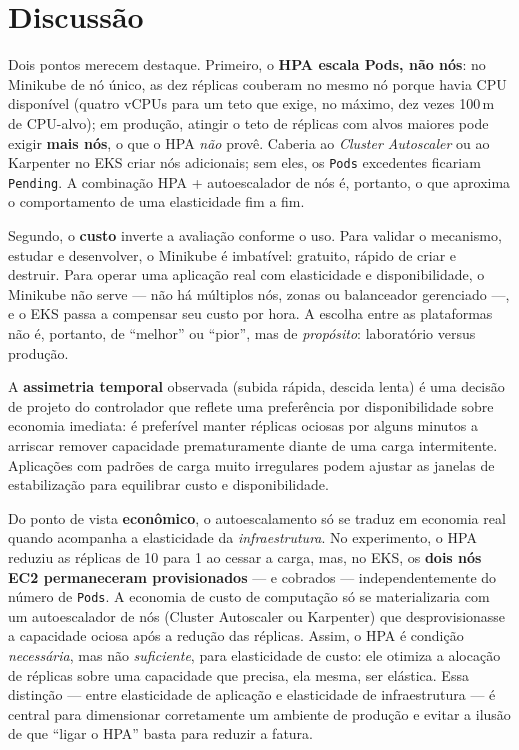 \documentclass[conference]{IEEEtran}
\begin{document}
\section{Discussão}\label{sec:disc}
Dois pontos merecem destaque. Primeiro, o \textbf{HPA escala Pods, não nós}: no Minikube de nó
único, as dez réplicas couberam no mesmo nó porque havia CPU disponível (quatro vCPUs para um teto
que exige, no máximo, dez vezes 100\,m de CPU-alvo); em produção, atingir o teto de réplicas com
alvos maiores pode exigir \textbf{mais nós}, o que o HPA \emph{não} provê. Caberia ao
\textit{Cluster Autoscaler} ou ao Karpenter no EKS criar nós adicionais; sem eles, os
\texttt{Pods} excedentes ficariam \texttt{Pending}. A combinação HPA + autoescalador de nós é,
portanto, o que aproxima o comportamento de uma elasticidade fim a fim.

Segundo, o \textbf{custo} inverte a avaliação conforme o uso. Para validar o mecanismo, estudar e
desenvolver, o Minikube é imbatível: gratuito, rápido de criar e destruir. Para operar uma
aplicação real com elasticidade e disponibilidade, o Minikube não serve --- não há múltiplos nós,
zonas ou balanceador gerenciado ---, e o EKS passa a compensar seu custo por hora. A escolha entre
as plataformas não é, portanto, de ``melhor'' ou ``pior'', mas de \emph{propósito}: laboratório
versus produção.

A \textbf{assimetria temporal} observada (subida rápida, descida lenta) é uma decisão de projeto
do controlador que reflete uma preferência por disponibilidade sobre economia imediata: é
preferível manter réplicas ociosas por alguns minutos a arriscar remover capacidade prematuramente
diante de uma carga intermitente. Aplicações com padrões de carga muito irregulares podem ajustar
as janelas de estabilização para equilibrar custo e disponibilidade.

Do ponto de vista \textbf{econômico}, o autoescalamento só se traduz em economia real quando
acompanha a elasticidade da \emph{infraestrutura}. No experimento, o HPA reduziu as réplicas de 10
para 1 ao cessar a carga, mas, no EKS, os \textbf{dois nós EC2 permaneceram provisionados} ---
e cobrados --- independentemente do número de \texttt{Pods}. A economia de custo de computação só
se materializaria com um autoescalador de nós (Cluster Autoscaler ou Karpenter) que
desprovisionasse a capacidade ociosa após a redução das réplicas. Assim, o HPA é condição
\emph{necessária}, mas não \emph{suficiente}, para elasticidade de custo: ele otimiza a alocação de
réplicas sobre uma capacidade que precisa, ela mesma, ser elástica. Essa distinção --- entre
elasticidade de aplicação e elasticidade de infraestrutura --- é central para dimensionar
corretamente um ambiente de produção e evitar a ilusão de que ``ligar o HPA'' basta para reduzir a
fatura.
\end{document}
